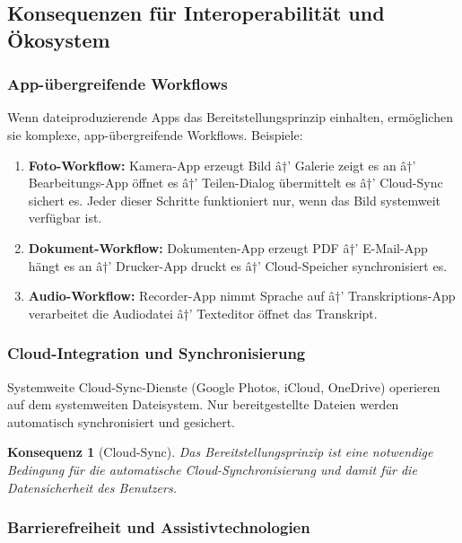 ﻿\documentclass[12pt, a4paper]{article}
\newtheorem{konsequenz}[definition]{Konsequenz}
\begin{document}
\subsection{Konsequenzen für Interoperabilität und Ökosystem}

\subsubsection{App-übergreifende Workflows}

Wenn dateiproduzierende Apps das Bereitstellungsprinzip einhalten, ermöglichen
sie komplexe, app-übergreifende Workflows. Beispiele:

\begin{enumerate}[label=\textbf{\arabic*.}]
  \item \textbf{Foto-Workflow:} Kamera-App erzeugt Bild â†’ Galerie zeigt es an â†’
    Bearbeitungs-App öffnet es â†’ Teilen-Dialog übermittelt es â†’ Cloud-Sync
    sichert es. Jeder dieser Schritte funktioniert nur, wenn das Bild systemweit
    verfügbar ist.
  \item \textbf{Dokument-Workflow:} Dokumenten-App erzeugt PDF â†’ E-Mail-App
    hängt es an â†’ Drucker-App druckt es â†’ Cloud-Speicher synchronisiert es.
  \item \textbf{Audio-Workflow:} Recorder-App nimmt Sprache auf â†’ Transkriptions-App
    verarbeitet die Audiodatei â†’ Texteditor öffnet das Transkript.
\end{enumerate}

\subsubsection{Cloud-Integration und Synchronisierung}

Systemweite Cloud-Sync-Dienste (Google Photos, iCloud, OneDrive) operieren auf
dem systemweiten Dateisystem. Nur bereitgestellte Dateien werden automatisch
synchronisiert und gesichert.

\begin{konsequenz}[Cloud-Sync]
Das Bereitstellungsprinzip ist eine notwendige Bedingung für die automatische
Cloud-Synchronisierung und damit für die Datensicherheit des Benutzers.
\end{konsequenz}

\subsubsection{Barrierefreiheit und Assistivtechnologien}
\end{document}
